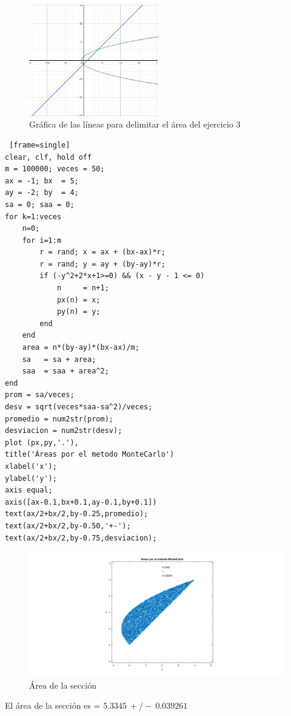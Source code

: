 \documentclass{article}
\begin{document}
\begin{figure}[H]
\centering
    \includegraphics[width=0.5\textwidth]{images/Capture03.PNG}
    \caption{Gráfica de las líneas para delimitar el área del ejercicio 3}
\end{figure}

\begin{lstlisting} [frame=single]
clear, clf, hold off
m = 100000; veces = 50;
ax = -1; bx  = 5;
ay = -2; by  = 4;
sa = 0; saa = 0;
for k=1:veces
    n=0;
    for i=1:m
        r = rand; x = ax + (bx-ax)*r;
        r = rand; y = ay + (by-ay)*r;
        if (-y^2+2*x+1>=0) && (x - y - 1 <= 0)
            n     = n+1;
            px(n) = x; 
            py(n) = y;
        end
    end
    area = n*(by-ay)*(bx-ax)/m;
    sa   = sa + area;
    saa  = saa + area^2;
end
prom = sa/veces;
desv = sqrt(veces*saa-sa^2)/veces;
promedio = num2str(prom);
desviacion = num2str(desv);
plot (px,py,'.'),
title('Áreas por el metodo MonteCarlo') 
xlabel('x');
ylabel('y');
axis equal;
axis([ax-0.1,bx+0.1,ay-0.1,by+0.1])
text(ax/2+bx/2,by-0.25,promedio);
text(ax/2+bx/2,by-0.50,'+-');
text(ax/2+bx/2,by-0.75,desviacion);
\end{lstlisting}

\clearpage
\newpage

\begin{figure}[H]
\centering
    \includegraphics[width=1\textwidth]{images/FIG03.png}
    \caption{Área de la sección}
\end{figure}
El área de la sección es = $5.3345~+/-~0.039261$
\end{document}

